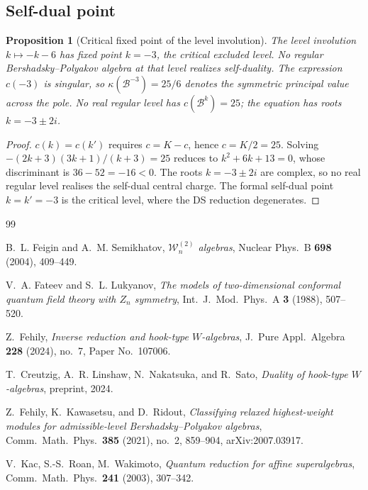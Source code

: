 \documentclass[11pt]{article}
\theoremstyle{plain}
\newtheorem{proposition}[theorem]{Proposition}
\theoremstyle{definition}
\theoremstyle{remark}
\newcommand{\cB}{\mathcal{B}}
\numberwithin{equation}{section}
\begin{document}
\subsection{Self-dual point}

\begin{proposition}[Critical fixed point of the level involution]
\label{prop:bp-self-dual-point}
The level involution $k\mapsto -k-6$ has fixed point $k=-3$, the
critical excluded level. No regular Bershadsky--Polyakov algebra at
that level realizes self-duality. The expression $c(-3)$ is singular,
so $\kappa(\cB^{-3})=25/6$ denotes the symmetric principal value
across the pole. No real regular level has $c(\cB^k)=25$; the
equation has roots $k=-3\pm2i$.
\end{proposition}

\begin{proof}
$c(k) = c(k')$ requires $c = K - c$, hence $c = K/2 = 25$.
Solving $-(2k+3)(3k+1)/(k+3) = 25$ reduces to
$k^2 + 6k + 13 = 0$, whose discriminant is $36 - 52 = -16 < 0$.
The roots $k = -3 \pm 2i$ are complex, so no real regular level
realises the self-dual central charge.
The formal self-dual point $k = k' = -3$ is the critical level,
where the DS reduction degenerates.
\end{proof}


\begin{thebibliography}{99}

B.~L. Feigin and A.~M. Semikhatov,
\emph{$\mathcal W_n^{(2)}$ algebras},
Nuclear Phys.~B \textbf{698} (2004), 409--449.

V.~A. Fateev and S.~L. Lukyanov,
\emph{The models of two-dimensional conformal quantum field theory with
$Z_n$ symmetry},
Int.\ J.\ Mod.\ Phys.\ A \textbf{3} (1988), 507--520.

Z.~Fehily,
\emph{Inverse reduction and hook-type $W$-algebras},
J.\ Pure Appl.\ Algebra \textbf{228} (2024), no.~7, Paper No.~107006.

T.~Creutzig, A.~R. Linshaw, N.~Nakatsuka, and R.~Sato,
\emph{Duality of hook-type $W$-algebras},
preprint, 2024.

Z.~Fehily, K.~Kawasetsu, and D.~Ridout,
\emph{Classifying relaxed highest-weight modules for admissible-level
Bershadsky--Polyakov algebras},
Comm.\ Math.\ Phys.\ \textbf{385} (2021), no.~2, 859--904,
arXiv:2007.03917.

V.~Kac, S.-S.~Roan, M.~Wakimoto,
\emph{Quantum reduction for affine superalgebras}, Comm.\ Math.\
Phys.\ \textbf{241} (2003), 307--342.

\end{thebibliography}
\end{document}
